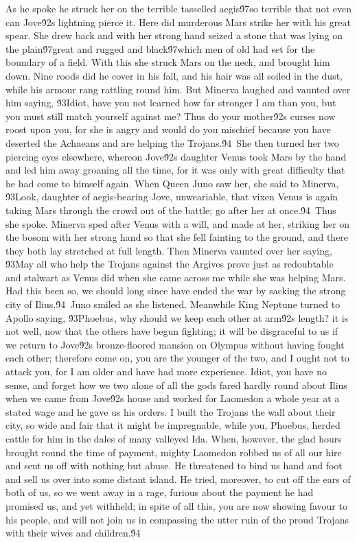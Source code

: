 {As he spoke he struck her on the terrible tasselled aegis\'97so terrible that not even can Jove\'92s lightning pierce it. Here did murderous Mars strike her with his great spear. She drew back and with her strong hand seized a stone that was lying on the plain\'97great and rugged and black\'97which men of old had set for the boundary of a field. With this she struck Mars on the neck, and brought him down. Nine roods did he cover in his fall, and his hair was all soiled in the dust, while his armour rang rattling round him. But Minerva laughed and vaunted over him saying, \'93Idiot, have you not learned how far stronger I am than you, but you must still match yourself against me? Thus do your mother\'92s curses now roost upon you, for she is angry and would do you mischief because you have deserted the Achaeans and are helping the Trojans.\'94\
She then turned her two piercing eyes elsewhere, whereon Jove\'92s daughter Venus took Mars by the hand and led him away groaning all the time, for it was only with great difficulty that he had come to himself again. When Queen Juno saw her, she said to Minerva, \'93Look, daughter of aegis-bearing Jove, unweariable, that vixen Venus is again taking Mars through the crowd out of the battle; go after her at once.\'94\
Thus she spoke. Minerva sped after Venus with a will, and made at her, striking her on the bosom with her strong hand so that she fell fainting to the ground, and there they both lay stretched at full length. Then Minerva vaunted over her saying, \'93May all who help the Trojans against the Argives prove just as redoubtable and stalwart as Venus did when she came across me while she was helping Mars. Had this been so, we should long since have ended the war by sacking the strong city of Ilius.\'94\
Juno smiled as she listened. Meanwhile King Neptune turned to Apollo saying, \'93Phoebus, why should we keep each other at arm\'92s length? it is not well, now that the others have begun fighting; it will be disgraceful to us if we return to Jove\'92s bronze-floored mansion on Olympus without having fought each other; therefore come on, you are the younger of the two, and I ought not to attack you, for I am older and have had more experience. Idiot, you have no sense, and forget how we two alone of all the gods fared hardly round about Ilius when we came from Jove\'92s house and worked for Laomedon a whole year at a stated wage and he gave us his orders. I built the Trojans the wall about their city, so wide and fair that it might be impregnable, while you, Phoebus, herded cattle for him in the dales of many valleyed Ida. When, however, the glad hours brought round the time of payment, mighty Laomedon robbed us of all our hire and sent us off with nothing but abuse. He threatened to bind us hand and foot and sell us over into some distant island. He tried, moreover, to cut off the ears of both of us, so we went away in a rage, furious about the payment he had promised us, and yet withheld; in spite of all this, you are now showing favour to his people, and will not join us in compassing the utter ruin of the proud Trojans with their wives and children.\'94\
}
